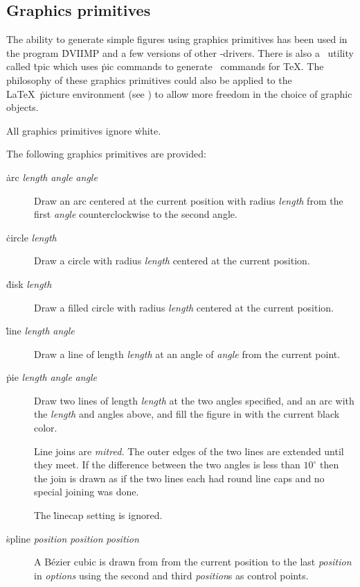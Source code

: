 \subsection{Graphics primitives}
The ability to generate simple figures using graphics primitives has
been used in the program \.{DVIIMP} \cite{ware:dviimp} and a few
versions of other \DVI-drivers. There is also a \Unix\ utility called
\.{tpic} which uses \.{pic} commands to generate \Special\ commands for
\TeX. The philosophy of these graphics primitives could also be
applied to the \LaTeX\ \.{picture} environment (see \cite{lamport:latex})
to allow more freedom in the choice of graphic objects.

All graphics primitives ignore \.{white}.

The following graphics primitives are provided:
\begin{description}
\item[\.{arc} {\it length\/} {\it angle\/} {\it angle\/}] Draw an arc
         centered at the current position with radius {\it length\/}
         from the first {\it angle\/} counterclockwise to the second
         angle.
\item[\.{circle} {\it length\/}] Draw a circle with radius {\it length\/}
         centered at the current position.
\item[\.{disk} {\it length\/}] Draw a filled circle with radius
         {\it length\/} centered at the current position.
\item[\.{line} {\it length\/} {\it angle}] Draw a line of length
         {\it length\/} at an angle of {\it angle\/} from the current
         point.
\item[\.{pie} {\it length\/} {\it angle\/} {\it angle\/}] Draw two lines
         of length {\it length\/} at the two angles specified, and an
         arc with the {\it length\/} and angles above, and fill the
         figure in with the current \.{black} color.

         Line joins are {\sl mitred.\/} The outer edges of the two lines
         are extended until they meet. If the difference between the two
         angles is less than $10^\circ$ then the join is drawn as if the
         two lines each had round line caps and no special joining was
         done.

         The \.{linecap} setting is ignored.
\item[\.{spline} {\it position\/} {\it position\/} {\it position\/}] A
         B\'ezier cubic is drawn from from the current position to
         the last {\it position\/} in {\it options\/} using the second
         and third {\it position\/}s as control points.
\end{description}

